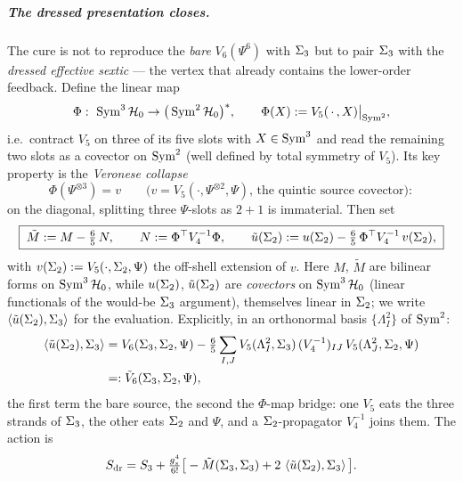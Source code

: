 \subparagraph{The dressed presentation closes.} The cure is not to reproduce the \emph{bare} $V_6(\Psi^6)$ with $\Sigma_3$ but
to pair $\Sigma_3$ with the \emph{dressed effective sextic} --- the vertex that already
contains the lower-order feedback. Define the linear map
\begin{equation}
	\Phi:\ \Sym^3\Hilb_0\to\big(\Sym^2\Hilb_0\big)^*,
	\qquad
	\Phi(X):=V_5(\,\cdot\,,X)\big|_{\Sym^2},
	\label{ped:eq:Phimap}
\end{equation}
i.e.\ contract $V_5$ on three of its five slots with $X\in\operatorname{Sym}^3$ and read the remaining
two slots as a covector on $\operatorname{Sym}^2$ (well defined by total symmetry of $V_5$). Its
key property is the \emph{Veronese collapse}
\begin{equation}
	\Phi(\Psi^{\otimes3})=v
	\qquad\big(v=V_5(\cdot,\Psi^{\otimes2},\Psi)\text{, the quintic source covector}\big):
	\label{ped:eq:Phicollapse}
\end{equation}
on the diagonal, splitting three $\Psi$-slots as $2{+}1$ is immaterial. Then set
\begin{equation}
	\boxed{\;
	\tilde M:=M-\tfrac65\,N,
	\qquad
	N:=\Phi^\top V_4^{-1}\Phi,
	\qquad
	\tilde u(\Sigma_2):=u(\Sigma_2)-\tfrac65\,\Phi^\top V_4^{-1}\,v(\Sigma_2),
	\;}
	\label{ped:eq:tildeMdef}
\end{equation}
with $v(\Sigma_2):=V_5(\cdot,\Sigma_2,\Psi)$ the off-shell extension of $v$. Here $M$,
$\tilde M$ are bilinear forms on $\operatorname{Sym}^3\mathcal{H}_0$, while $u(\Sigma_2)$, $\tilde u(\Sigma_2)$
are \emph{covectors} on $\operatorname{Sym}^3\mathcal{H}_0$ (linear functionals of the would-be $\Sigma_3$
argument), themselves linear in $\Sigma_2$; we write $\left \langle \tilde u(\Sigma_2),\Sigma_3 \right \rangle$ for
the evaluation. Explicitly, in an orthonormal basis $\{\Lambda^2_I\}$ of $\operatorname{Sym}^2$:
\begin{equation}
	\begin{aligned}
	\left \langle \tilde u(\Sigma_2),\Sigma_3 \right \rangle
	&= V_6(\Sigma_3,\Sigma_2,\Psi)
	- \tfrac65\sum_{I,J} V_5(\Lambda^2_I,\Sigma_3)\,(V_4^{-1})_{IJ}\,V_5(\Lambda^2_J,\Sigma_2,\Psi)
	\\&=: \tilde V_6(\Sigma_3,\Sigma_2,\Psi),
	\end{aligned}
	\label{ped:eq:utildeexplicit}
\end{equation}
the first term the bare source, the second the $\Phi$-map bridge: one $V_5$ eats the
three strands of $\Sigma_3$, the other eats $\Sigma_2$ and $\Psi$, and a $\Sigma_2$-propagator
$V_4^{-1}$ joins them. The action is
\begin{equation}
	S_{\rm dr}
	= S_3
	+ \tfrac{g_s^4}{6!}\big[-\tilde M(\Sigma_3,\Sigma_3)+2\,\left \langle \tilde u(\Sigma_2),\Sigma_3 \right \rangle\big].
	\label{ped:eq:Sdr}
\end{equation}
